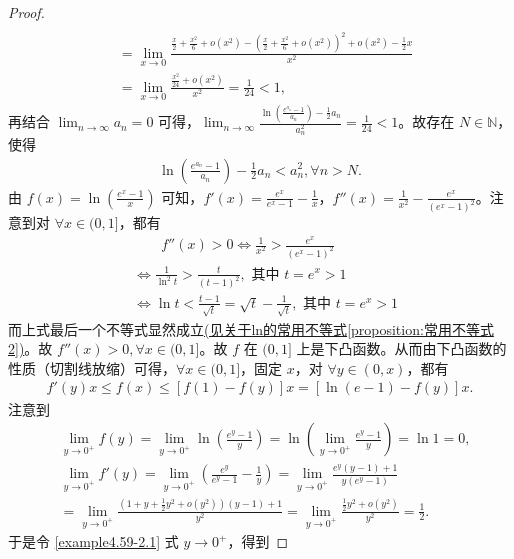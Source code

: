 \documentclass[../../main.tex]{subfiles}
\begin{document}
\begin{proof}
\begin{align*}
\\
&=\lim_{x\rightarrow 0} \frac{\frac{x}{2}+\frac{x^2}{6}+o(x^2)-\left( \frac{x}{2}+\frac{x^2}{6}+o(x^2) \right) ^2+o(x^2)-\frac{1}{2}x}{x^2}
\\
&=\lim_{x\rightarrow 0} \frac{\frac{x^2}{24}+o(x^2)}{x^2}=\frac{1}{24}<1,
\end{align*}
再结合 \(\lim_{n \to \infty} a_n = 0\) 可得，\(\lim_{n \to \infty} \frac{\ln\left(\frac{e^{a_n} - 1}{a_n}\right) - \frac{1}{2} a_n}{a_n^2} = \frac{1}{24} < 1\)。故存在 \(N \in \mathbb{N}\)，使得
\begin{align}
\ln\left(\frac{e^{a_n} - 1}{a_n}\right) - \frac{1}{2} a_n < a_n^2,\forall n > N. \label{example4.59-3.1}
\end{align}
由 \(f(x)=\ln\left(\frac{e^x - 1}{x}\right)\) 可知，\(f'(x)=\frac{e^x}{e^x - 1} - \frac{1}{x}\)，\(f''(x)=\frac{1}{x^2} - \frac{e^x}{(e^x - 1)^2}\)。注意到对 \(\forall x \in (0, 1]\)，都有
\begin{align*}
& \quad \quad f''(x) > 0 \Leftrightarrow \frac{1}{x^2} > \frac{e^x}{(e^x - 1)^2}\\
&\Leftrightarrow \frac{1}{\ln^2 t} > \frac{t}{(t - 1)^2},\text{ 其中 }t = e^x > 1\\
&\Leftrightarrow \ln t < \frac{t - 1}{\sqrt{t}} = \sqrt{t} - \frac{1}{\sqrt{t}},\text{ 其中 }t = e^x > 1
\end{align*}
而上式最后一个不等式显然成立\hyperref[proposition:常用不等式2]{(见关于ln的常用不等式\ref{proposition:常用不等式2})}。故 \(f''(x) > 0,\forall x \in (0, 1]\)。故 \(f\) 在 \((0, 1]\) 上是下凸函数。从而由下凸函数的性质（切割线放缩）可得，\(\forall x \in (0, 1]\)，固定 \(x\)，对 \(\forall y \in (0, x)\)，都有
\begin{align}
f'(y) x \leqslant  f(x) \leqslant  [f(1) - f(y)] x = [\ln(e - 1) - f(y)] x. \label{example4.59-2.1}
\end{align}
注意到
\begin{align*}
&\lim_{y \to 0^+} f(y) = \lim_{y \to 0^+} \ln\left(\frac{e^y - 1}{y}\right) = \ln\left(\lim_{y \to 0^+} \frac{e^y - 1}{y}\right) = \ln 1 = 0,\\
&\lim_{y \to 0^+} f'(y) = \lim_{y \to 0^+} \left(\frac{e^y}{e^y - 1} - \frac{1}{y}\right) = \lim_{y \to 0^+} \frac{e^y(y - 1) + 1}{y(e^y - 1)}\\
&= \lim_{y \to 0^+} \frac{(1 + y + \frac{1}{2} y^2 + o(y^2))(y - 1) + 1}{y^2} = \lim_{y \to 0^+} \frac{\frac{1}{2} y^2 + o(y^2)}{y^2} = \frac{1}{2}.
\end{align*}
于是令 \eqref{example4.59-2.1} 式 \(y \to 0^+\)，得到

\end{proof}
\end{document}
